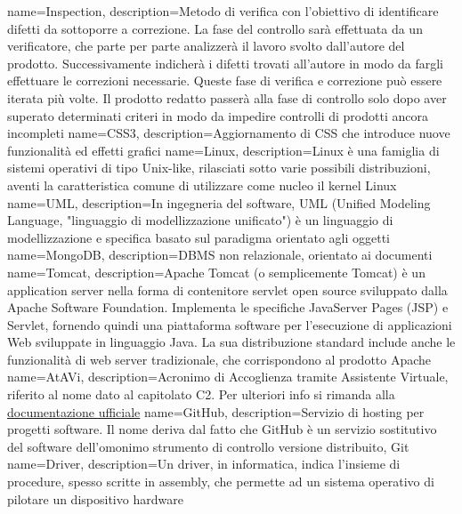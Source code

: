  {
	name=Inspection,
	description={Metodo di verifica con l'obiettivo di identificare difetti da sottoporre a correzione. La fase del controllo sarà effettuata da un verificatore, che parte per parte analizzerà il lavoro svolto dall'autore del prodotto. Successivamente indicherà i difetti trovati all'autore in modo da fargli effettuare le correzioni necessarie. Queste fase di verifica e correzione può essere iterata più volte. 
	Il prodotto redatto passerà alla fase di controllo solo dopo aver superato determinati criteri in modo da impedire controlli di prodotti ancora incompleti}
}
 {
	name=CSS3,
	description={Aggiornamento di CSS che introduce nuove funzionalità ed effetti grafici} 
}
 {
	name=Linux,
	description={Linux è una famiglia di sistemi operativi di tipo Unix-like, rilasciati sotto varie possibili distribuzioni, aventi la caratteristica comune di utilizzare come nucleo il kernel Linux}
}
 {
	name=UML,
	description={In ingegneria del software, UML (Unified Modeling Language, "linguaggio di modellizzazione unificato") è un linguaggio di modellizzazione e specifica basato sul paradigma orientato agli oggetti}
}
 {
	name=MongoDB,
	description={DBMS non relazionale, orientato ai documenti}
}
 {
	name=Tomcat,
	description={Apache Tomcat (o semplicemente Tomcat) è un application server nella forma di contenitore servlet open source sviluppato dalla Apache Software Foundation. Implementa le specifiche JavaServer Pages (JSP) e Servlet, fornendo quindi una piattaforma software per l'esecuzione di applicazioni Web sviluppate in linguaggio Java. La sua distribuzione standard include anche le funzionalità di web server tradizionale, che corrispondono al prodotto Apache}
}
 {
	name=AtAVi,
	description={Acronimo di Accoglienza tramite Assistente Virtuale, riferito al nome dato al capitolato C2. Per ulteriori info si rimanda alla \href{http://www.math.unipd.it/~tullio/IS-1/2016/Progetto/C2.pdf}{documentazione ufficiale}}
}
 {
	name=GitHub,
	description={Servizio di hosting per progetti software. Il nome deriva dal fatto che GitHub è un servizio sostitutivo del software dell'omonimo strumento di controllo versione distribuito, Git}
}
 {
	name=Driver,
	description={Un driver, in informatica, indica l'insieme di procedure, spesso scritte in assembly, che permette ad un sistema operativo di pilotare un dispositivo hardware}
}
